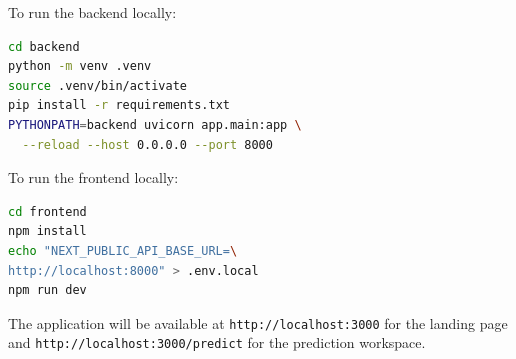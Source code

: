 \documentclass[conference]{IEEEtran}
\begin{document}
To run the backend locally:
\begin{lstlisting}[language=bash]
cd backend
python -m venv .venv
source .venv/bin/activate
pip install -r requirements.txt
PYTHONPATH=backend uvicorn app.main:app \
  --reload --host 0.0.0.0 --port 8000
\end{lstlisting}

To run the frontend locally:
\begin{lstlisting}[language=bash]
cd frontend
npm install
echo "NEXT_PUBLIC_API_BASE_URL=\
http://localhost:8000" > .env.local
npm run dev
\end{lstlisting}

The application will be available at \texttt{http://localhost:3000} for the landing page and \texttt{http://localhost:3000/predict} for the prediction workspace.
\end{document}
